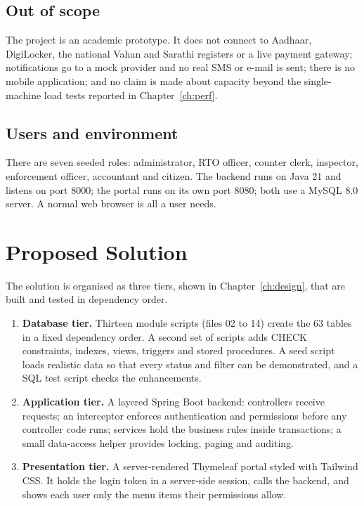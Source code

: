 \subsection{Out of scope}
The project is an academic prototype. It does not connect to Aadhaar, DigiLocker, the
national Vahan and Sarathi registers or a live payment gateway; notifications go to a
mock provider and no real SMS or e-mail is sent; there is no mobile application; and
no claim is made about capacity beyond the single-machine load tests reported in
Chapter~\ref{ch:perf}.

\subsection{Users and environment}
There are seven seeded roles: administrator, RTO officer, counter clerk, inspector,
enforcement officer, accountant and citizen. The backend runs on Java 21 and listens on
port 8000; the portal runs on its own port 8080; both use a MySQL 8.0 server. A normal
web browser is all a user needs.

\section{Proposed Solution}
The solution is organised as three tiers, shown in Chapter~\ref{ch:design}, that are
built and tested in dependency order.

\begin{enumerate}
\item \textbf{Database tier.} Thirteen module scripts (files 02 to 14) create the 63
tables in a fixed dependency order. A second set of scripts adds CHECK constraints, indexes, views, triggers and
stored procedures. A seed script loads realistic data so that every status and filter
can be demonstrated, and a SQL test script checks the enhancements.
\item \textbf{Application tier.} A layered Spring Boot backend: controllers receive
requests; an interceptor enforces authentication and permissions before any controller
code runs; services hold the business rules inside transactions; a small data-access
helper provides locking, paging and auditing.
\item \textbf{Presentation tier.} A server-rendered Thymeleaf portal styled with
Tailwind CSS. It holds the login token in a server-side session, calls the backend,
and shows each user only the menu items their permissions allow.
\end{enumerate}

